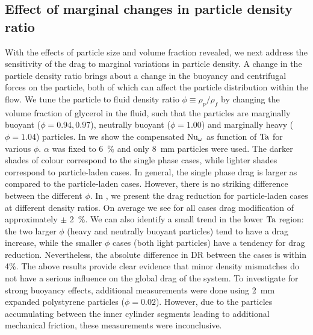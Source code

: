 \subsection{Effect of marginal changes in particle density ratio}
With the effects of particle size and volume fraction revealed, we next
address the sensitivity of the drag to marginal variations in particle
density. A change in the particle density ratio brings about a change in the
buoyancy and  centrifugal forces on the particle, both of which can affect the
particle distribution within the flow. We tune the particle to fluid density
ratio $\phi \equiv \rho_p/\rho_f$ by changing the volume fraction of glycerol
in the fluid, such that the particles are marginally buoyant ($\phi = 0.94,
0.97$), neutrally buoyant ($\phi=1.00$) and marginally heavy ($\phi=1.04$)
particles. In  we show the compensated
$\text{Nu}_\omega$ as function of $\text{Ta}$ for various $\phi$. $\alpha$ was fixed to
\SI{6}{\percent} and only \SI{8}{\milli\metre} particles were used. The darker
shades of colour correspond to the single phase cases, while lighter shades
correspond to particle-laden cases. In general, the single phase drag is
larger as compared to the particle-laden cases. However, there is no striking
difference between the different $\phi$.  In , we
present the drag reduction for particle-laden cases at different density
ratios. On average we see for all cases drag modification of approximately
$\pm$ \SI{2}{\percent}. We can also identify a small trend in the lower $\text{Ta}$
region: the two larger $\phi$ (heavy and neutrally buoyant particles) tend to
have a drag increase, while the smaller $\phi$ cases (both light particles)
have a tendency for drag reduction. Nevertheless, the absolute difference in
DR between the cases is within 4\%. The above results provide clear evidence
that minor density mismatches do not have a serious influence on the global
drag of the system.  To investigate for strong buoyancy effects,
additional measurements were done using \SI{2}{\milli\metre} expanded
polystyrene particles ($\phi=0.02$).  However, due to the particles
accumulating between the inner cylinder segments leading to additional
mechanical friction, these measurements were inconclusive.

